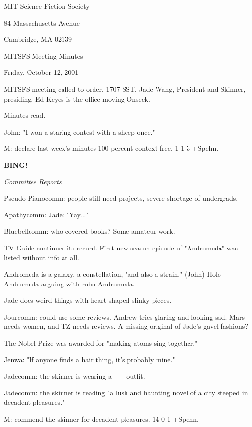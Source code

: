 \documentclass[12pt]{article}
\newcommand{\bing}{{\bf BING!} }
\newcommand{\goto}[1]{\bing \vskip 12pt \centerline{{\em{#1}}}}
\begin{document}
\begin{center}

MIT Science Fiction Society 

84 Massachusetts Avenue

Cambridge, MA 02139

\vspace{12pt}

MITSFS Meeting Minutes 

Friday, October 12, 2001

\end{center}
 
\vspace{18pt}

\setlength{\parskip}{6pt}

\noindent
MITSFS meeting called to order, 1707 SST, Jade Wang, President and
Skinner, presiding.  Ed Keyes is the office-moving Onseck.

Minutes read.

John: "I won a staring contest with a sheep once."

M: declare last week's minutes 100 percent context-free. 1-1-3 +Spehn.

\goto{Committee Reports}

Pseudo-Pianocomm: people still need projects, severe shortage of undergrads.

Apathycomm: Jade: "Yay..."

Bluebellcomm: who covered books? Some amateur work.

TV Guide continues its record. First new season episode of "Andromeda" was listed without info at all.

Andromeda is a galaxy, a constellation, "and also a strain." (John) Holo-Andromeda arguing with robo-Andromeda.

Jade does weird things with heart-shaped slinky pieces.

Jourcomm: could use some reviews. Andrew tries glaring and looking sad. Mars needs women, and TZ needs reviews. A missing original of Jade's gavel fashions?

The Nobel Prize was awarded for "making atoms sing together."

Jenwa: "If anyone finds a hair thing, it's probably mine."

Jadecomm: the skinner is wearing a ----- outfit.

Jadecomm: the skinner is reading "a lush and haunting novel of a city steeped in decadent pleasures."

M: commend the skinner for decadent pleasures. 14-0-1 +Spehn.
\end{document}
